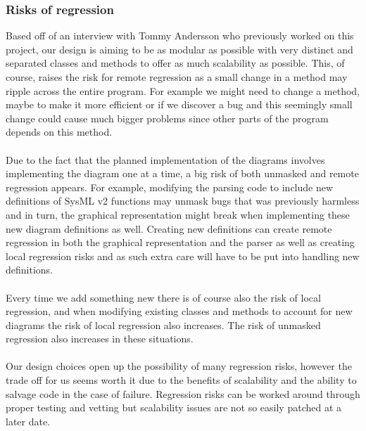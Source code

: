 \documentclass{article}
\begin{document}

\subsubsection{Risks of regression}

Based off of an interview with Tommy Andersson who previously worked on this project, our design is aiming to be as modular as possible with very distinct and separated classes and methods to offer as much scalability as possible. This, of course, raises the risk for remote regression as a small change in a method may ripple across the entire program. For example we might need to change a method, maybe to make it more efficient or if we discover a bug and this seemingly small change could cause much bigger problems since other parts of the program depends on this method. 
\\\\
Due to the fact that the planned implementation of the diagrams involves implementing the diagram one at a time, a big risk of both unmasked and remote regression appears. For example, modifying the parsing code  to include new definitions of SysML v2 functions may unmask bugs that was previously harmless and in turn, the graphical representation might break when implementing these new diagram definitions as well. Creating new definitions can create remote regression in both the graphical representation and the parser as well as creating local regression risks and as such extra care will have to be put into handling new definitions.
\\\\
Every time we add something new there is of course also the risk of local regression, and when modifying existing classes and methods to account for new diagrams the risk of local regression also increases. The risk of unmasked regression also increases in these situations.
\\\\
Our design choices open up the possibility of many regression risks, however the trade off for us seems worth it due to the benefits of scalability and the ability to salvage code in the case of failure. Regression risks can be worked around through proper testing and vetting but scalability issues are not so easily patched at a later date.
\end{document}
